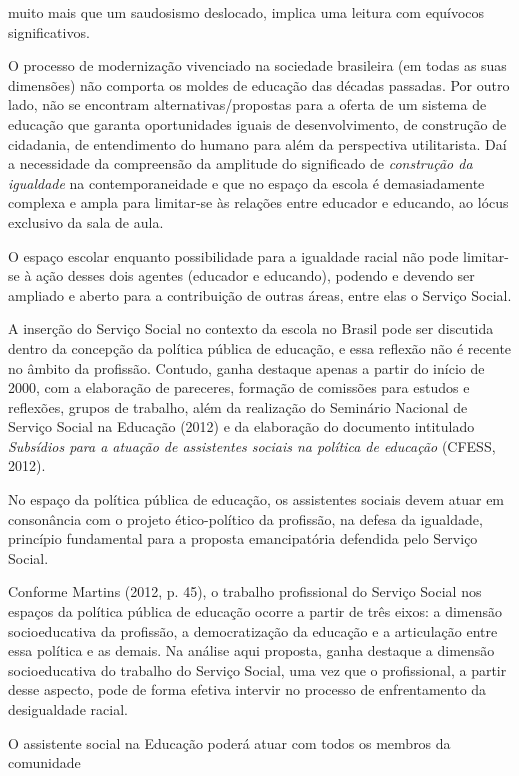  muito mais que um saudosismo deslocado, implica uma leitura com equívocos
 significativos.\par O processo de modernização vivenciado na sociedade brasileira (em todas as suas
 dimensões) não comporta os moldes de educação das décadas passadas. Por outro lado,
 não se encontram alternativas/propostas para a oferta de um sistema de educação que
 garanta oportunidades iguais de desenvolvimento, de construção de cidadania, de
 entendimento do humano para além da perspectiva utilitarista. Daí a necessidade da
 compreensão da amplitude do significado de \textit{construção da igualdade}
 na contemporaneidade e que no espaço da escola é demasiadamente complexa e ampla para
 limitar-se às relações entre educador e educando, ao lócus exclusivo da sala de
 aula.\par O espaço escolar enquanto possibilidade para a igualdade racial não pode limitar-se à
 ação desses dois agentes (educador e educando), podendo e devendo ser ampliado e
 aberto para a contribuição de outras áreas, entre elas o Serviço Social.\par A inserção do Serviço Social no contexto da escola no Brasil pode ser discutida
 dentro da concepção da política pública de educação, e essa reflexão não é recente no
 âmbito da profissão. Contudo, ganha destaque apenas a partir do início de 2000, com a
 elaboração de pareceres, formação de comissões para estudos e reflexões, grupos de
 trabalho, além da realização do Seminário Nacional de Serviço Social na Educação
 (2012) e da elaboração do documento intitulado \textit{Subsídios para a atuação de
 assistentes sociais na política de educação} (CFESS, 2012).\par No espaço da política pública de educação, os assistentes sociais devem atuar em
 consonância com o projeto ético-político da profissão, na defesa da igualdade,
 princípio fundamental para a proposta emancipatória defendida pelo Serviço
 Social.\par Conforme Martins (2012, p. 45), o trabalho
 profissional do Serviço Social nos espaços da política pública de educação ocorre a
 partir de três eixos: a dimensão socioeducativa da profissão, a democratização da
 educação e a articulação entre essa política e as demais. Na análise aqui proposta,
 ganha destaque a dimensão socioeducativa do trabalho do Serviço Social, uma vez que o
 profissional, a partir desse aspecto, pode de forma efetiva intervir no processo de
 enfrentamento da desigualdade racial.\par O assistente social na Educação poderá atuar com todos os membros da comunidade
